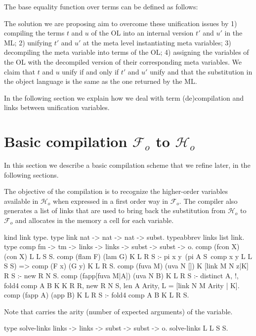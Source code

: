 \documentclass[sigconf,natbib=false]{acmart}
\newcommand{\Fo}{\ensuremath{\mathcal{F}_{\!o}\xspace}} %
\newcommand{\Ho}{\ensuremath{\mathcal{H}_o}\xspace}
\begin{document}
The base equality function over terms can be defined as follows:

The solution we are proposing aim to overcome these unification issues by 1)
compiling the terms $t$ and $u$ of the OL into an internal version $t'$ and $u'$
in the ML; 2) unifying $t'$ and $u'$ at the meta level instantiating meta
variables; 3) decompiling the meta variable into terms of the OL; 4) assigning
the variables of the OL with the decompiled version of their corresponding meta
variables. We claim that $t$ and $u$ unify if and only if $t'$ and $u'$ unify
and that the substitution in the object language is the same as the one returned
by the ML.  

In the following section we explain how we deal with term (de)compilation and
links between unification variables.

\section[Compilation: fo\_tm to tm]{Basic compilation \Fo{} to \Ho{}}
\label{sec:compilation}

In this section we describe a basic compilation scheme that we refine
later, in the following sections.

The objective of the compilation is to recognize the higher-order variables
available in \Ho{} when expressed in a first order way in \Fo{}. The compiler
also generates a list of links that are used to bring back the substitution from
\Ho{} to \Fo{} and allocates in the memory a cell for each variable.

\begin{elpicode}
kind link type.
type link nat -> nat -> nat -> subst. %
typeabbrev links list link.
type comp fm -> tm -> links -> links -> subst -> subst -> o.
comp (fcon X) (con X) L L S S.
comp (flam F) (lam G) K L R S :- pi x y\
  (pi A S\ comp x y L L S S) => comp (F x) (G y) K L R S.
comp (fuva M) (uva N []) K [link M N z|K] R S :- new R N S.
comp (fapp[fuva M|A]) (uva N B) K L R S :- distinct A, !,
  fold4 comp A B K K R R,
  new R N S, len A Arity,
  L = [link N M Arity | K].
comp (fapp A) (app B) K L R S :- fold4 comp A B K L R S.
\end{elpicode}

\noindent
Note that  carries the arity (number of expected arguments) of
the variable. \marginpar{say when this is needed}

\begin{elpicode}
type solve-links links -> links -> subst -> subst -> o.
solve-links L L S S.
\end{elpicode}
\end{document}
